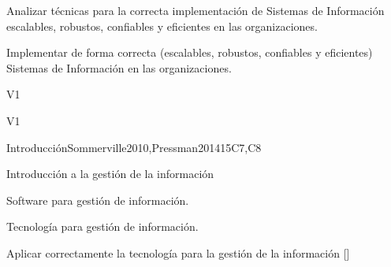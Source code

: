 \begin{syllabus}


\begin{justification}
Analizar técnicas para la correcta implementación de Sistemas de Información escalables, robustos, confiables y eficientes en las organizaciones.
\end{justification}

\begin{goals}
\item Implementar de forma correcta (escalables, robustos, confiables y eficientes) Sistemas de Información en las organizaciones.
\end{goals}

\begin{outcomes}{V1}
    \item {}
    \item {}
    \item {}
\end{outcomes}

\begin{competences}{V1}
    \item {} 
    \item {} 
    \item {} 
    \item {} 
    \item {} 
    \item {} 
\end{competences}

\begin{unit}{Introducción}{}{Sommerville2010,Pressman2014}{15}{C7,C8}
\begin{topics}
    \item Introducción a la gestión de la información
    \item Software para gestión de información.
    \item Tecnología para gestión de información.
\end{topics}
\begin{learningoutcomes}
    \item Aplicar correctamente la tecnología para la gestión de la información [\Assessment]
\end{learningoutcomes}
\end{unit}


\end{syllabus}
